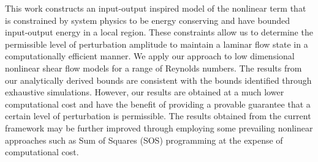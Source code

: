 \documentclass[10pt, a4paper]{article}
\begin{document}
This work constructs an input-output inspired model of the nonlinear term that is constrained by system physics to be energy conserving and have bounded input-output energy in a local region. These constraints allow us to determine the permissible level of perturbation amplitude to maintain a laminar flow state in a computationally efficient manner. We apply our approach to low dimensional nonlinear shear flow models \citep{Moehlis2004} for a range of Reynolds numbers. The results from our analytically derived bounds are consistent with the bounds identified through exhaustive simulations. However, our results are obtained at a much lower computational cost and have the benefit of providing a provable guarantee that a certain level of perturbation is permissible. The results obtained from the current framework may be further improved through employing some prevailing nonlinear approaches such as Sum of Squares (SOS) programming at the expense of computational cost.



\vspace{-5mm}
\setlength{\bibsep}{-0pt}
\renewcommand\bibpreamble{\vspace{-1\baselineskip}} %
{\footnotesize}


\end{document}
